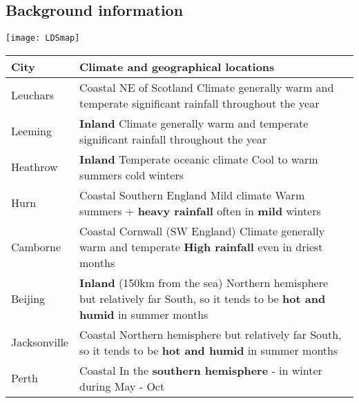 \subsection{Background information}
\texttt{[image: LDSmap]}\\
\begin{tabular}{|p{2cm}|p{15cm}|}
    \hline
    \textbf{City} & \textbf{Climate and geographical locations}                                                                                                           \\
    \hline
    Leuchars      & Coastal \newline NE of Scotland \newline Climate generally warm and temperate \newline significant rainfall throughout the year                       \\
    \hline
    Leeming       & \textbf{Inland} \newline Climate generally warm and temperate \newline significant rainfall throughout the year                                       \\
    \hline
    Heathrow      & \textbf{Inland} \newline Temperate oceanic climate \newline Cool to warm summers \newline cold winters                                                \\
    \hline
    Hurn          & Coastal \newline Southern England \newline Mild climate \newline Warm summers + \textbf{heavy rainfall} often in \textbf{mild} winters                \\
    \hline
    Camborne      & Coastal \newline Cornwall (SW England) \newline Climate generally warm and temperate \newline \textbf{High rainfall} even in driest months            \\
    \hline
    Beijing       & \textbf{Inland} (150km from the sea) \newline Northern hemisphere but relatively far South, so it tends to be \textbf{hot and humid} in summer months \\
    \hline
    Jacksonville  & Coastal \newline Northern hemisphere but relatively far South, so it tends to be \textbf{hot and humid} in summer months                              \\
    \hline
    Perth         & Coastal \newline In the \textbf{southern hemisphere} - in winter during May - Oct                                                                     \\
    \hline
\end{tabular}\\
